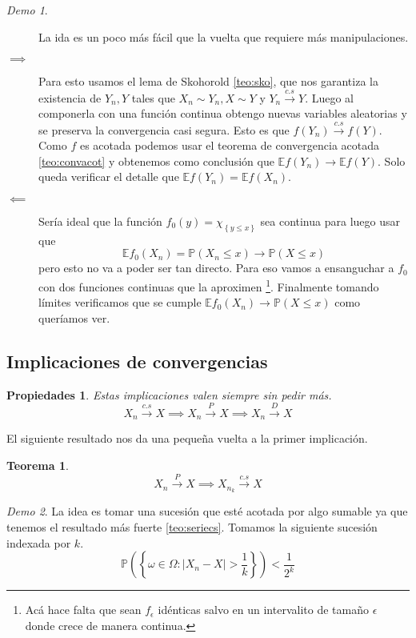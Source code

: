 \documentclass[11pt]{article}
\theoremstyle{plain} %
\newtheorem{teorema}{Teorema}
\newtheorem*{props}{Propiedades}
\theoremstyle{definition}
\theoremstyle{remark}
\newtheorem*{demo}{Demo}
\def\Om{\Omega}
\def\E{\mathbb{E}}
\def\P{\mathbb{P}}
\def\vas{variables aleatorias }
\renewcommand\qed{\ding{110}}
\newcommand{\cs}{\overset{c.s}{\to}}
\newcommand{\proba}{\overset{P}{\to}}
\newcommand{\dist}{\overset{D}{\to}}
\begin{document}
\begin{demo}
	\begin{description}
	 
	 La ida es un poco más fácil que la vuelta que requiere más manipulaciones.
	 
	\item[$\implies$] Para esto usamos el lema de Skohorold \ref{teo:sko}, que nos garantiza la existencia de $Y_n, Y$ tales que $X_n \sim Y_n, X \sim Y$ y $Y_n \cs Y$. Luego al componerla  con una función continua obtengo nuevas \vas y se preserva la convergencia casi segura. Esto es que $f(Y_n) \cs f(Y)$. Como $f$ es acotada podemos usar el teorema de convergencia acotada \ref{teo:convacot} y obtenemos como conclusión que $\E f(Y_n) \to \E f(Y)$. Solo queda verificar el detalle que $\E f(Y_n) = \E f(X_n)$.
	
	\item[$\impliedby$] Sería ideal que la función $f_0(y) = \chi_{\left\lbrace y \leq x\right\rbrace }$ sea continua para luego usar que 
	\[ \E f_0(X_n) = \P(X_n \leq x) \to \P(X \leq x) \]
	pero esto no va a poder ser tan directo. Para eso vamos a ensanguchar a $f_0$ con dos funciones continuas que la aproximen \footnote{Acá hace falta que sean $f_{\epsilon}$ idénticas salvo en un intervalito de tamaño $\epsilon$ donde crece de manera continua.}. Finalmente tomando límites verificamos que se cumple $\E f_0(X_n) \to \P(X \leq x)$ como queríamos ver.
	\end{description}
\end{demo}


\subsection{Implicaciones de convergencias}

\begin{props}
	Estas implicaciones valen siempre sin pedir más. \[ X_n \cs X \implies X_n \proba X \implies X_n \dist X \]
\end{props}

El siguiente resultado nos da una pequeña vuelta a la primer implicación.

\begin{teorema}
	\[ X_n \proba X \implies X_{n_{k}} \cs X  \]
\end{teorema}

\begin{demo}
	La idea es tomar una sucesión que esté acotada por algo sumable ya que tenemos el resultado más fuerte \ref{teo:seriecs}. Tomamos la siguiente sucesión indexada por $k$.
	\[ \P  \left( \left\lbrace \omega \in \Om : |X_n - X| > \frac{1}{k} \right\rbrace \right) < \frac{1}{2^k}  \]	\qed
\end{demo}
\end{document}
